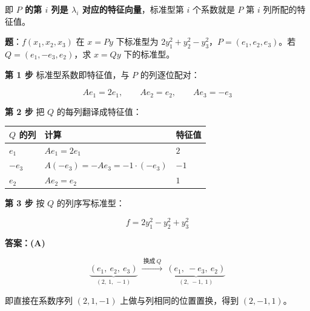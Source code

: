 \documentclass[11pt,a4paper]{ctexart}
\begin{document}


即 \textbf{$P$ 的第 $i$ 列是 $\lambda_i$ 对应的特征向量}，标准型第 $i$ 个系数就是 $P$ 第 $i$ 列所配的特征值。



\textbf{题}：$f(x_1,x_2,x_3)$ 在 $x=Py$ 下标准型为 $2y_1^2+y_2^2-y_3^2$，$P=(e_1,e_2,e_3)$。若 $Q=(e_1,-e_3,e_2)$，求 $x=Qy$ 下的标准型。

\textbf{第 1 步} 标准型系数即特征值，与 $P$ 的列逐位配对：

\[
Ae_1=2e_1,\qquad Ae_2=e_2,\qquad Ae_3=-e_3
\]

\textbf{第 2 步} 把 $Q$ 的每列翻译成特征值：

\begin{center}\small
\begin{tabularx}{\linewidth}{@{}>{\raggedright\arraybackslash}X>{\raggedright\arraybackslash}X>{\raggedright\arraybackslash}X@{}}
\toprule
$Q$ 的列 & 计算 & 特征值 \\
\midrule
$e_1$ & $Ae_1=2e_1$ & $2$ \\
$-e_3$ & $A(-e_3)=-Ae_3=-1\cdot(-e_3)$ & $-1$ \\
$e_2$ & $Ae_2=e_2$ & $1$ \\
\bottomrule
\end{tabularx}
\end{center}

\textbf{第 3 步} 按 $Q$ 的列序写标准型：

\[
\boxed{\,f=2y_1^2-y_2^2+y_3^2\,}
\]

\textbf{答案：(A)}




\[
\underbrace{(e_1,\ e_2,\ e_3)}_{(2,\ 1,\ -1)}
\ \xrightarrow{\ \text{换成}\ Q\ }\
\underbrace{(e_1,\ -e_3,\ e_2)}_{(2,\ -1,\ 1)}
\]

即直接在系数序列 $(2,1,-1)$ 上做与列相同的位置置换，得到 $(2,-1,1)$。
\end{document}
